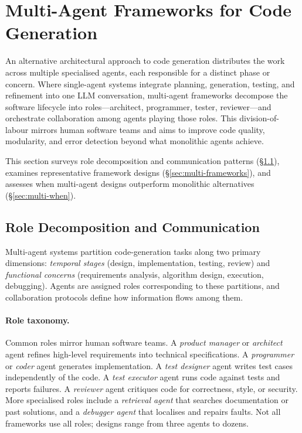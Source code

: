 
\section{Multi-Agent Frameworks for Code Generation}
\label{sec:multiagent}

An alternative architectural approach to code generation distributes the work
across multiple specialised agents, each responsible for a distinct phase or
concern. Where single-agent systems integrate planning, generation, testing,
and refinement into one LLM conversation, multi-agent frameworks decompose the
software lifecycle into roles---architect, programmer, tester, reviewer---and
orchestrate collaboration among agents playing those roles. This
division-of-labour mirrors human software teams and aims to improve code
quality, modularity, and error detection beyond what monolithic agents achieve.

This section surveys role decomposition and communication patterns
(\S\ref{sec:multi-roles}), examines representative framework designs
(\S\ref{sec:multi-frameworks}), and assesses when multi-agent designs
outperform monolithic alternatives (\S\ref{sec:multi-when}).

\subsection{Role Decomposition and Communication}
\label{sec:multi-roles}

Multi-agent systems partition code-generation tasks along two primary
dimensions: \emph{temporal stages} (design, implementation, testing, review)
and \emph{functional concerns} (requirements analysis, algorithm design,
execution, debugging). Agents are assigned roles corresponding to these
partitions, and collaboration protocols define how information flows among them.

\paragraph{Role taxonomy.}
Common roles mirror human software teams. A \emph{product manager} or
\emph{architect} agent refines high-level requirements into technical
specifications. A \emph{programmer} or \emph{coder} agent generates
implementation. A \emph{test designer} agent writes test cases independently of
the code. A \emph{test executor} agent runs code against tests and reports
failures. A \emph{reviewer} agent critiques code for correctness, style, or
security. More specialised roles include a \emph{retrieval agent} that searches
documentation or past solutions, and a \emph{debugger agent} that localises and
repairs faults. Not all frameworks use all roles; designs range from three
agents to dozens.


